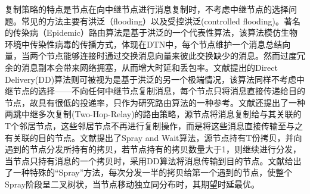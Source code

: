 复制策略的特点是节点在向中继节点进行消息复制时，不考虑中继节点的选择问题。常见的方法主要有洪泛（flooding）以及受控洪泛(controlled flooding)。著名的传染病（Epidemic）路由算法是基于洪泛的一个代表性算法，该算法模仿生物环境中传染性病毒的传播方式，体现在DTN中，每个节点维护一个消息总结向量，当两个节点能够连接时通过交换消息向量来彼此交换缺少的消息。然而过度冗余的消息副本会带来网络拥塞，从而增大时延和丢包率。文献提出的Direct Delivery(DD)算法则可被视为是基于洪泛的另一个极端情况，该算法同样不考虑中继节点的选择——不向任何中继节点复制消息，每个节点只将消息直接传递给目的节点，故具有很低的投递率，只作为研究路由算法的一种参考。文献还提出了一种两跳中继多次复制(Two-Hop-Relay)的路由策略，源节点将消息复制给与其关联的T个邻居节点，这些邻居节点不再进行复制操作，而是将这些消息直接传输至与之有关联的目的节点。文献提出了Spray and Wait算法，源节点持有T份拷贝，并向遇到的节点分发所持有的拷贝，若节点持有的拷贝数量大于1，则继续进行分发，当节点只持有消息的一个拷贝时，采用DD算法将消息传输到目的节点。文献给出了一种特殊的“Spray”方法，每次分发一半的拷贝给第一个遇到的节点，使整个Spray阶段呈二叉树状，当节点移动独立同分布时，其期望时延最优。



